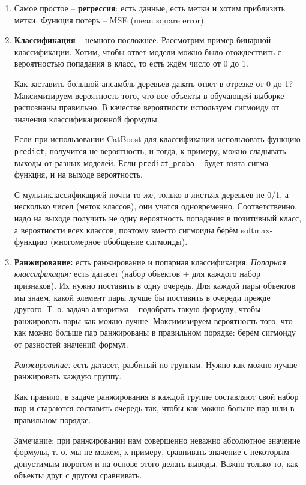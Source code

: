 \documentclass[a4paper,12pt]{article}
\begin{document}
\begin{enumerate}[noitemsep]
    \item Самое простое -- \textbf{регрессия}: есть данные, есть метки и хотим приблизить метки.
    Функция потерь -- MSE (mean square error).
    \item \textbf{Классификация} -- немного посложнее.
    Рассмотрим пример бинарной классификации.
    Хотим, чтобы ответ модели можно было отождествить с вероятностью попадания в класс, то есть ждём число от 0 до 1.

    Как заставить большой ансамбль деревьев давать ответ в отрезке от 0 до 1?
    Максимизируем вероятность того, что все объекты в обучающей выборке распознаны правильно.
    В качестве вероятности используем сигмоиду от значения классификационной формулы.

    \begin{leftbar}
        Если при использовании CatBoost для классификации использовать функцию \texttt{predict}, получится не вероятность, и тогда, к примеру, можно сладывать выходы от разных моделей.
        Если \texttt{predict\_proba} -- будет взята сигма-функция, и на выходе вероятность.
    \end{leftbar}
    С мультиклассификацией почти то же, только в листьях деревьев не 0/1, а несколько чисел (меток классов), они учатся одновременно.
    Соответственно, надо на выходе получить не одну вероятность попадания в позитивный класс, а вероятности всех классов; поэтому вместо сигмоиды берём softmax-функцию (многомерное обобщение сигмоиды).

    \item \textbf{Ранжирование:} есть ранжирование и попарная классификация.
    \textit{Попарная классификация:} есть датасет (набор объектов + для каждого набор признаков). Их нужно поставить в одну очередь. Для каждой пары объектов мы знаем, какой элемент пары лучше бы поставить в очереди прежде другого.
    Т. о. задача алгоритма -- подобрать такую формулу, чтобы ранжировать пары как можно лучше.
    Максимизируем вероятность того, что как можно больше пар ранжированы в правильном порядке: берём сигмоиду от разностей значений формул.

    \textit{Ранжирование:} есть датасет, разбитый по группам.
    Нужно как можно лучше ранжировать каждую группу.

    Как правило, в задаче ранжирования в каждой группе составляют свой набор пар и стараются составить очередь так, чтобы как можно больше пар шли в правильном порядке.

    Замечание: при ранжировании нам совершенно неважно абсолютное значение формулы, т. о. мы не можем, к примеру, сравнивать значение с некоторым допустимым порогом и на основе этого делать выводы.
    Важно только то, как объекты друг с другом сравнивать.
\end{enumerate}
\end{document}
